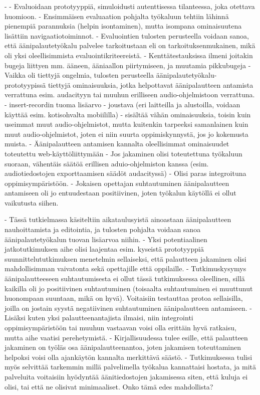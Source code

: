 \documentclass[utf8]{gradu3}
\begin{document}
- 
- Evaluoidaan prototyyppiä, simuloidusti autenttisessa tilanteessa, joka otettava huomioon.
- Ensimmäisen evaluaation pohjalta työkaluun tehtiin lähinnä pienempiä parannuksia (helpin isontaminen), mutta isompana ominaisuutena lisättiin navigaatiotoiminnot.
- Evaluointien tulosten perusteella voidaan sanoa, että äänipalautetyökalu palvelee tarkoitustaan eli on tarkoituksenmukainen, mikä oli yksi oleellisimmista evaluointikriteereistä.
- Kenttätestauksissa ilmeni joitakin bugeja liittyen mm. ääneen, ääniaallon piirtymiseen, ja muutamia pikkubugeja
- Vaikka oli tiettyjä ongelmia, tulosten perusteella äänipalautetyökalu-prototyypissä tiettyjä ominaisuuksia, jotka helpottavat äänipalautteen antamista verrattuna esim. audacityyn tai muuhun erilliseen audio-ohjelmistoon verrattuna. 
	- insert-recordin tuoma lisäarvo
	- joustava (eri laitteilla ja alustoilla, voidaan käyttää esim. kotisohvalta mobiililla)
	- sisältää vähän ominaisuuksia, toisin kuin useimmat muut audio-ohjelmistot, mutta kuitenkin tarpeeksi samanlainen kuin muut audio-ohjelmistot, joten ei niin suurta oppimiskynnystä, jos jo kokemusta muista.
	- Äänipalautteen antamisen kannalta oleellisimmat ominaisuudet toteutettu web-käyttöliittymään
	- Jos jakaminen olisi toteutettuna työkaluun suoraan, vähentäis säätöä erillisen aduio-ohjelmiston kanssa (esim. audiotiedostojen exporttaamisen säädöt audacityssä)
	- Olisi paras integroituna oppimisympäristöön.
- Jokaisen opettajan suhtautuminen äänipalautteen antamiseen oli jo entuudestaan positiivinen, joten työkalun käytöllä ei ollut vaikutusta siihen.

- Tässä tutkielmassa käsiteltiin aikataulusyistä ainoastaan äänipalautteen nauhoittamista ja editointia, ja tulosten pohjalta voidaan sanoa äänipalautetyökalun tuovan lisäarvoa niihin.
- Yksi potentiaalinen jatkotutkimuksen aihe olisi laajentaa esim. kyseistä prototyyppiä suunnittelututkimuksen menetelmin sellaiseksi, että palautteen jakaminen olisi mahdollisimman vaivatonta sekä opettajille että oppilaille.
- Tutkimuskysymys äänipalautteeseen suhtautumisesta ei ollut tässä tutkimuksessa oleellinen, sillä kaikilla oli jo positiivinen suhtautuminen (toisaalta suhtautuminen ei muuttunut huonompaan suuntaan, mikä on hyvä). Voitaisiin testauttaa protoa sellaisilla, joilla on jostain syystä negatiivinen suhtautuminen äänipalautteen antamiseen.
- Lisäksi kuten yksi palautteenantajista ilmaisi, niin integrointi oppimisympäristöön tai muuhun vastaavan voisi olla erittäin hyvä ratkaisu, mutta aihe vaatisi perehetymistä.
- Kirjallisuudessa tulee esille, että palautteen jakaminen on työläs osa äänipalautteenantoa, joten jakamisen toteuttaminen helpoksi voisi olla ajankäytön kannalta merkittävä säästö.
- Tutkimuksessa tulisi myös selvittää tarkemmin millä palvelimella työkalua kannattaisi hostata, ja mitä palveluita voitaisiin hyödyntää äänitiedostojen jakamisessa siten, että kuluja ei olisi, tai että ne olisivat minimaaliset. Onko tämä edes mahdollista?
\end{document}
